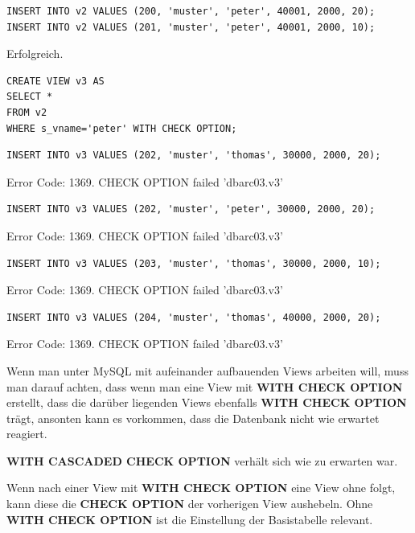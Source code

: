 \documentclass[10pt]{scrreprt}
\newcommand{\Bold}[1]{\textbf{#1}} %
\begin{document}
\begin{lstlisting}[style=sql]
INSERT INTO v2 VALUES (200, 'muster', 'peter', 40001, 2000, 20);
INSERT INTO v2 VALUES (201, 'muster', 'peter', 40001, 2000, 10);
\end{lstlisting}
Erfolgreich.

\begin{lstlisting}[style=sql]
CREATE VIEW v3 AS
SELECT *
FROM v2
WHERE s_vname='peter' WITH CHECK OPTION;
\end{lstlisting}

\begin{lstlisting}[style=sql]
INSERT INTO v3 VALUES (202, 'muster', 'thomas', 30000, 2000, 20);
\end{lstlisting}
Error Code: 1369. CHECK OPTION failed 'dbarc03.v3'

\begin{lstlisting}[style=sql]
INSERT INTO v3 VALUES (202, 'muster', 'peter', 30000, 2000, 20);
\end{lstlisting}
Error Code: 1369. CHECK OPTION failed 'dbarc03.v3'
\newpage
\begin{lstlisting}[style=sql]
INSERT INTO v3 VALUES (203, 'muster', 'thomas', 30000, 2000, 10);
\end{lstlisting}
Error Code: 1369. CHECK OPTION failed 'dbarc03.v3'

\begin{lstlisting}[style=sql]
INSERT INTO v3 VALUES (204, 'muster', 'thomas', 40000, 2000, 20);
\end{lstlisting}
Error Code: 1369. CHECK OPTION failed 'dbarc03.v3'\newline\newline

Wenn man unter MySQL mit aufeinander aufbauenden Views arbeiten will, muss man darauf achten, dass wenn man eine View mit \Bold{WITH CHECK OPTION} erstellt, dass die darüber liegenden Views ebenfalls \Bold{WITH CHECK OPTION} trägt, ansonten kann es vorkommen, dass die Datenbank nicht wie erwartet reagiert.\newline\newline

\Bold{WITH CASCADED CHECK OPTION} verhält sich wie zu erwarten war.\newline\newline

Wenn nach einer View mit \Bold{WITH CHECK OPTION} eine View ohne folgt, kann diese die \Bold{CHECK OPTION} der vorherigen View aushebeln. Ohne \Bold{WITH CHECK OPTION} ist die Einstellung der Basistabelle relevant.
\end{document}
